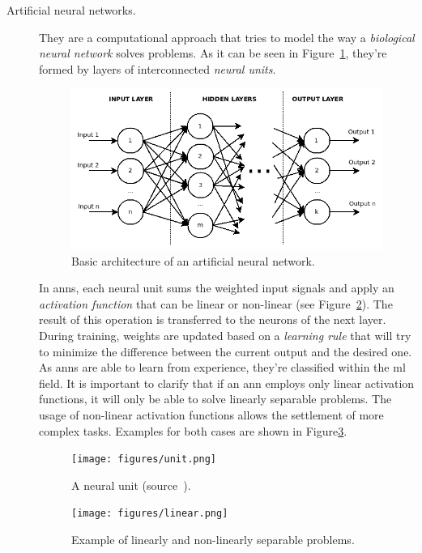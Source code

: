 \begin{description}
	\item[Artificial neural networks.] They are a computational approach that tries to model the way a \emph{biological neural network} solves problems\cite{Goodfellow-et-al-2016}. As it can be seen in Figure~\ref{fig:ANN}, they're formed by layers of interconnected \emph{neural units}.
	\begin{figure}
		\centering
		\includegraphics[width=0.8\linewidth, keepaspectratio]{figures/ANN.png}
		\caption{Basic architecture of an artificial neural network.}
		\label{fig:ANN}
	\end{figure}
	
	In \glspl{ann}, each neural unit sums the weighted input signals and apply an \emph{activation function} that can be linear or non-linear (see Figure~\ref{fig:unit}). The result of this operation is transferred to the neurons of the next layer. During training, weights are updated based on a \emph{learning rule} that will try to minimize the difference between the current output and the desired one. As \glspl{ann} are able to learn from experience, they're classified within the \gls{ml} field. It is important to clarify that if an \gls{ann} employs only linear activation functions, it will only be able to solve linearly separable problems. The usage of non-linear activation functions allows the settlement of more complex tasks. Examples for both cases are shown in Figure\ref{fig:linear}.	
	\begin{figure}
		\centering
		\texttt{[image: figures/unit.png]}
		\caption{A neural unit (source~\cite{neural-unit}).}
		\label{fig:unit}
	\end{figure}
	\begin{figure}
		\centering
		\texttt{[image: figures/linear.png]}
		\caption{Example of linearly and non-linearly separable problems.}
		\label{fig:linear}
	\end{figure}
\end{description}
